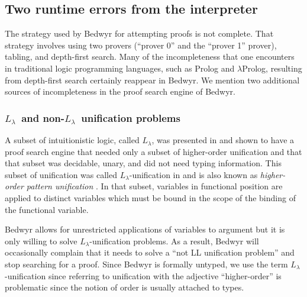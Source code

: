 \documentclass{article}
\newcommand{\lp}{$\lambda$Prolog}
\newcommand{\Ll}{$L_\lambda$}
\begin{document}
\subsection{Two runtime errors from the interpreter}

The strategy used by Bedwyr for attempting proofs is not complete.
That strategy involves using two provers (``prover 0'' and the
``prover 1'' prover), tabling, and depth-first search.  
Many of the incompleteness that one encounters in
traditional logic programming languages, such as Prolog and \lp,
resulting from depth-first search certainly reappear in Bedwyr.  We
mention two additional sources of incompleteness in the proof search
engine of Bedwyr.

\subsubsection{\Ll\ and non-\Ll\ unification problems}
A subset of intuitionistic logic, called \Ll, was presented in
\cite{miller91jlc} and shown to have a proof search engine that needed
only a subset of higher-order unification and that that subset was
decidable, unary, and did not need typing information.  This subset
of unification was called \Ll-unification in \cite{miller91jlc} and
is also known as {\em higher-order pattern unification}
\cite{nipkow93lics,nadathur05iclp}.  In that subset, variables in
functional position are applied to distinct variables which must be
bound in the scope of the binding of the functional variable.

Bedwyr allows for unrestricted applications of variables to argument
but it is only willing to solve \Ll-unification problems.  As a result,
Bedwyr will occasionally complain that it needs to solve a ``not LL
unification problem'' and stop searching for a proof.  Since Bedwyr is
formally untyped, we use the term \Ll-unification since referring to
unification with the adjective ``higher-order'' is problematic since
the notion of order is usually attached to types.
\end{document}
